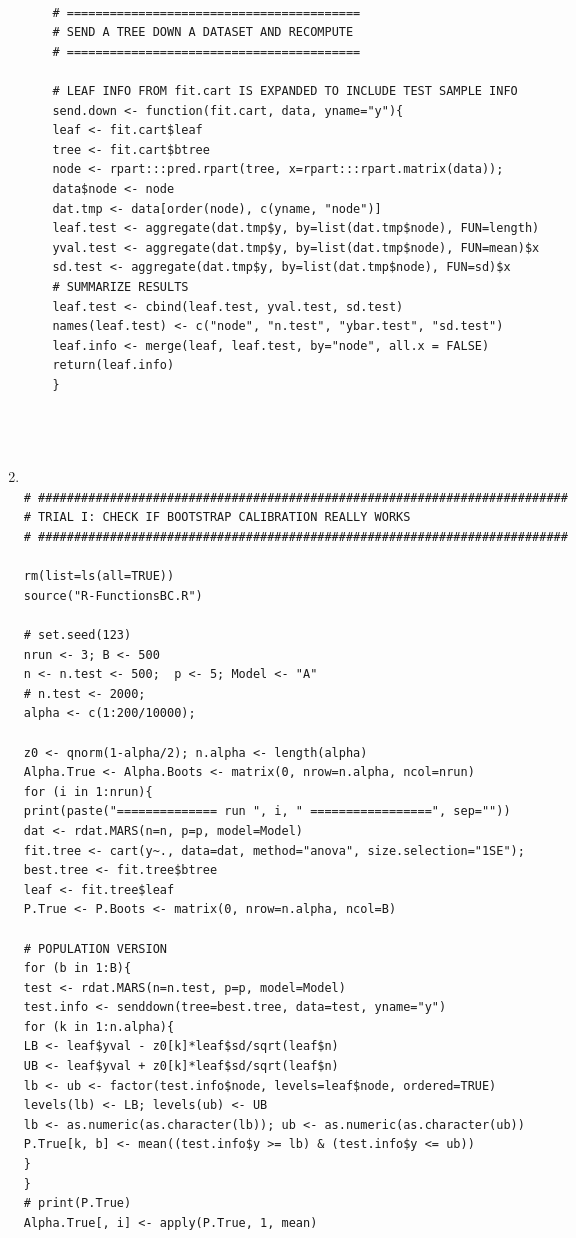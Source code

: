 \begin{enumerate}[A]
\begin{verbatim}
	
	# =========================================
	# SEND A TREE DOWN A DATASET AND RECOMPUTE
	# =========================================
	
	# LEAF INFO FROM fit.cart IS EXPANDED TO INCLUDE TEST SAMPLE INFO
	send.down <- function(fit.cart, data, yname="y"){
	leaf <- fit.cart$leaf
	tree <- fit.cart$btree
	node <- rpart:::pred.rpart(tree, x=rpart:::rpart.matrix(data)); 
	data$node <- node
	dat.tmp <- data[order(node), c(yname, "node")]
	leaf.test <- aggregate(dat.tmp$y, by=list(dat.tmp$node), FUN=length)
	yval.test <- aggregate(dat.tmp$y, by=list(dat.tmp$node), FUN=mean)$x
	sd.test <- aggregate(dat.tmp$y, by=list(dat.tmp$node), FUN=sd)$x
	# SUMMARIZE RESULTS
	leaf.test <- cbind(leaf.test, yval.test, sd.test)
	names(leaf.test) <- c("node", "n.test", "ybar.test", "sd.test")
	leaf.info <- merge(leaf, leaf.test, by="node", all.x = FALSE)
	return(leaf.info)
	}




\end{verbatim}

\item\begin{verbatim}

# ##########################################################################
# TRIAL I: CHECK IF BOOTSTRAP CALIBRATION REALLY WORKS 
# ##########################################################################

rm(list=ls(all=TRUE))
source("R-FunctionsBC.R")

# set.seed(123)
nrun <- 3; B <- 500
n <- n.test <- 500;  p <- 5; Model <- "A"
# n.test <- 2000;
alpha <- c(1:200/10000); 

z0 <- qnorm(1-alpha/2); n.alpha <- length(alpha)
Alpha.True <- Alpha.Boots <- matrix(0, nrow=n.alpha, ncol=nrun)
for (i in 1:nrun){
print(paste("============== run ", i, " =================", sep=""))
dat <- rdat.MARS(n=n, p=p, model=Model)
fit.tree <- cart(y~., data=dat, method="anova", size.selection="1SE");
best.tree <- fit.tree$btree 
leaf <- fit.tree$leaf	
P.True <- P.Boots <- matrix(0, nrow=n.alpha, ncol=B)

# POPULATION VERSION
for (b in 1:B){		
test <- rdat.MARS(n=n.test, p=p, model=Model)
test.info <- senddown(tree=best.tree, data=test, yname="y")
for (k in 1:n.alpha){
LB <- leaf$yval - z0[k]*leaf$sd/sqrt(leaf$n)
UB <- leaf$yval + z0[k]*leaf$sd/sqrt(leaf$n)
lb <- ub <- factor(test.info$node, levels=leaf$node, ordered=TRUE)
levels(lb) <- LB; levels(ub) <- UB
lb <- as.numeric(as.character(lb)); ub <- as.numeric(as.character(ub))
P.True[k, b] <- mean((test.info$y >= lb) & (test.info$y <= ub)) 
}
}
# print(P.True)
Alpha.True[, i] <- apply(P.True, 1, mean)


\end{verbatim}
\end{enumerate}
